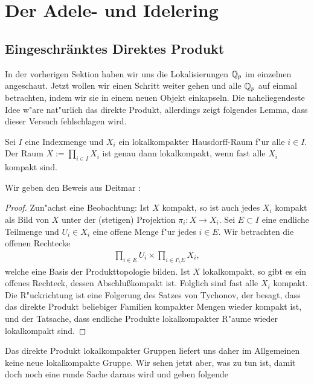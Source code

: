 \section{Der Adele- und Idelering}
	
	\subsection{Eingeschränktes Direktes Produkt}\label{kapitel:RDP}
		In der vorherigen Sektion haben wir uns die Lokalisierungen ${\mathbb{Q}_p}$ im einzelnen angeschaut. Jetzt wollen wir einen Schritt weiter gehen und alle ${\mathbb{Q}_p}$ auf einmal betrachten, indem wir sie in einem neuen Objekt einkapseln. Die naheliegendeste Idee w"are nat"urlich das direkte Produkt, allerdings zeigt folgendes Lemma, dass dieser Versuch fehlschlagen wird.
		\begin{lemma}\label{Lemma:lokalkompaktProd}
			Sei $I$ eine Indexmenge und $X_i$ ein lokalkompakter Hausdorff-Raum f"ur alle $i \in I$. Der Raum $X:=\prod_{i \in I} X_i$ ist genau dann lokalkompakt, wenn fast alle $X_i$ kompakt sind.
		\end{lemma}
		Wir geben den Beweis aus Deitmar \cite{deitmar2010}:
		\begin{proof}
			Zun"achst eine Beobachtung: Ist $X$ kompakt, so ist auch jedes $X_i$ kompakt als Bild von $X$ unter der (stetigen) Projektion $\pi_i:X \to X_i$.
			Sei $E \subset I$ eine endliche Teilmenge und $U_i \in X_i$ eine offene Menge f"ur jedes $i \in E$. Wir betrachten die offenen Rechtecke
			\begin{align*}
				\prod_{i \in E} U_i \times \prod_{i \in I\setminus E} X_i,
			\end{align*}
			welche eine Basis der Produkttopologie bilden. Ist $X$ lokalkompakt, so gibt es ein offenes Rechteck, dessen Abschlu\ss kompakt ist. 
			Folglich sind fast alle $X_i$ kompakt. 
			Die R"uckrichtung ist eine Folgerung des Satzes von Tychonov, der besagt, dass das direkte Produkt beliebiger Familien kompakter Mengen wieder kompakt ist, und der Tatsache, dass endliche Produkte lokalkompakter R"aume wieder lokalkompakt sind.
		\end{proof}
		Das direkte Produkt lokalkompakter Gruppen liefert uns daher im Allgemeinen keine neue lokalkompakte Gruppe. Wir sehen jetzt aber, was zu tun ist, damit doch noch eine runde Sache daraus wird und geben folgende
